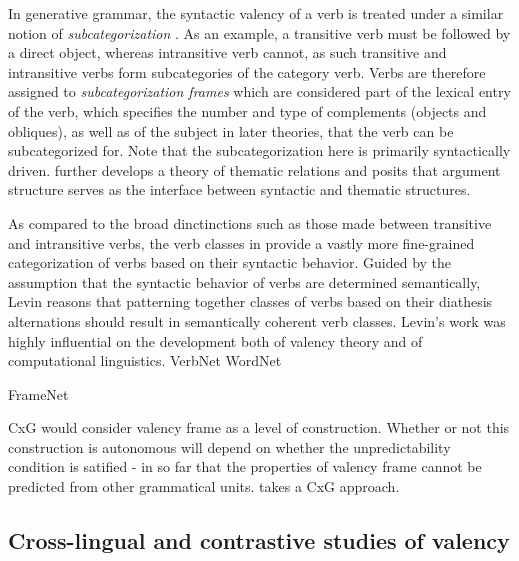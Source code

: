 In generative grammar, the syntactic valency of a verb is treated under a similar notion of \textit{subcategorization} \citep{chomsky1965a}. As an example, a transitive verb must be followed by a direct object, whereas intransitive verb cannot, as such transitive and intransitive verbs form subcategories of the category verb. Verbs are therefore assigned to \textit{subcategorization frames} which are considered part of the lexical entry of the verb, which specifies the number and type of complements (objects and obliques), as well as of the subject in later theories, that the verb can be subcategorized for. Note that the subcategorization here is primarily syntactically driven. \citet{jackendoff1972,jackendoff1987,jackendoff1992} further develops a theory of thematic relations and posits that argument structure serves as the interface between syntactic and thematic structures.

As compared to the broad dinctinctions such as those made between transitive and intransitive verbs, the verb classes in \citet{levin1993} provide a vastly more fine-grained categorization of verbs based on their syntactic behavior. Guided by the assumption that the syntactic behavior of verbs are determined semantically, Levin reasons that patterning together classes of verbs based on their diathesis alternations should result in semantically coherent verb classes. Levin's work was highly influential on the development both of valency theory and of computational linguistics. VerbNet \cite{kipper-schuler2005, kipper2006, kipper2008} WordNet \cite{fellbaum1998, miller1995}
\citep{fillmore1967,fillmore1970} 

FrameNet \citep{fillmore2015}

CxG would consider valency frame as a level of construction. Whether or not this construction is autonomous will depend on whether the unpredictability condition is satified - in so far that the properties of valency frame cannot be predicted from other grammatical units.
\citet{croft2012} takes a CxG approach. 


\subsection{Cross-lingual and contrastive studies of valency}

